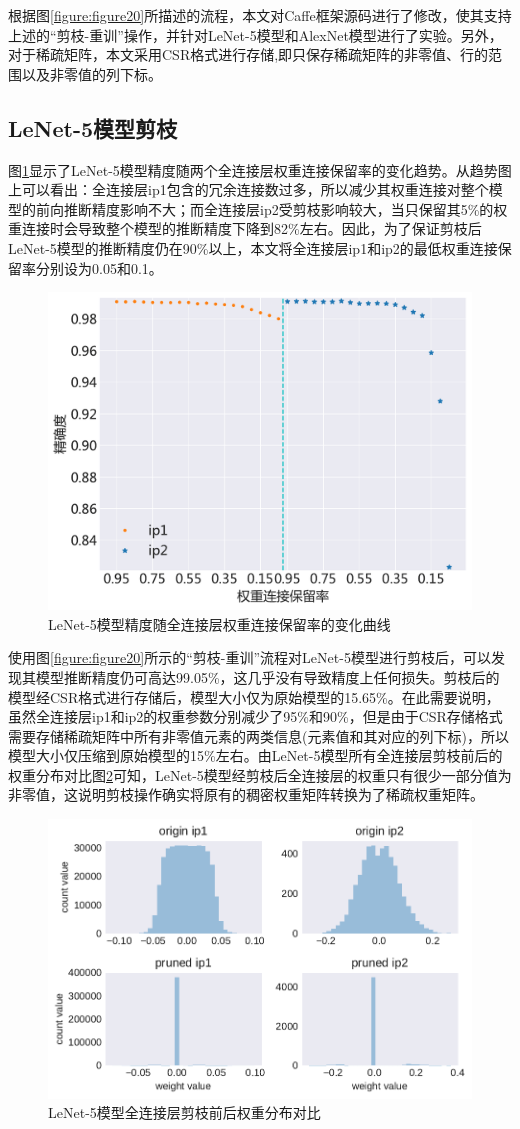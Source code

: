 根据图\ref{figure:figure20}所描述的流程，本文对Caffe框架源码进行了修改，使其支持上述的“剪枝-重训”操作，并针对LeNet-5模型和AlexNet模型进行了实验。另外，对于稀疏矩阵，本文采用CSR格式进行存储,即只保存稀疏矩阵的非零值、行的范围以及非零值的列下标。

\subsection{LeNet-5模型剪枝}

图\ref{figure:figure21}显示了LeNet-5模型精度随两个全连接层权重连接保留率的变化趋势。从趋势图上可以看出：全连接层ip1包含的冗余连接数过多，所以减少其权重连接对整个模型的前向推断精度影响不大；而全连接层ip2受剪枝影响较大，当只保留其5\%的权重连接时会导致整个模型的推断精度下降到82\%左右。因此，为了保证剪枝后LeNet-5模型的推断精度仍在90\%以上，本文将全连接层ip1和ip2的最低权重连接保留率分别设为0.05和0.1。

\begin{figure}[htbp]
    \centering
    \includegraphics[height=0.4\textwidth]{figures/lenet_pruned_threshold.pdf}
    \caption{LeNet-5模型精度随全连接层权重连接保留率的变化曲线}\label{figure:figure21}
\end{figure}

使用图\ref{figure:figure20}所示的“剪枝-重训”流程对LeNet-5模型进行剪枝后，可以发现其模型推断精度仍可高达99.05\%，这几乎没有导致精度上任何损失。剪枝后的模型经CSR格式进行存储后，模型大小仅为原始模型的15.65\%。在此需要说明，虽然全连接层ip1和ip2的权重参数分别减少了95\%和90\%，但是由于CSR存储格式需要存储稀疏矩阵中所有非零值元素的两类信息(元素值和其对应的列下标)，所以模型大小仅压缩到原始模型的15\%左右。由LeNet-5模型所有全连接层剪枝前后的权重分布对比图\ref{figure:figure22}可知，LeNet-5模型经剪枝后全连接层的权重只有很少一部分值为非零值，这说明剪枝操作确实将原有的稠密权重矩阵转换为了稀疏权重矩阵。

\begin{figure}[htbp]
    \centering
    \includegraphics[height=0.41\textwidth]{figures/lenet_pruned_weights.pdf}
    \caption{LeNet-5模型全连接层剪枝前后权重分布对比}\label{figure:figure22}
\end{figure}

